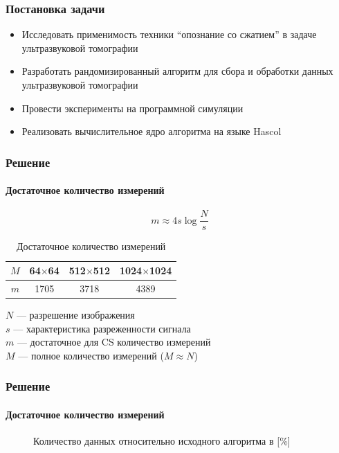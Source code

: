 \documentclass{beamer}
\begin{document}
\begin{frame}
\frametitle{Постановка задачи}
\begin{itemize}
\item Исследовать применимость техники ``опознание со сжатием'' в задаче ультразвуковой томографии
\item Разработать рандомизированный алгоритм для сбора и обработки данных ультразвуковой томографии
\item Провести эксперименты на программной симуляции
\item Реализовать вычислительное ядро алгоритма на языке Hascol
\end{itemize}

\end{frame}

\begin{frame}
\frametitle{Решение}
\framesubtitle{Достаточное количество измерений}
$$m \approx 4s\log{\frac{N}{s}}$$
\begin{table}[h]
	\centering
	\caption{Достаточное количество измерений}
	\begin{tabular}{| c | c | c | c |}
    	\hline
		$M$ & 64$\times$64 & 512$\times$512 & 1024$\times$1024 \\
    	\hline
    	$m$ & 1705 & 3718 & 4389 \\
    	\hline
	\end{tabular}
\end{table}

\small
$N$ --- разрешение изображения\\
$s$ --- характеристика разреженности сигнала\\
$m$ --- достаточное для CS количество измерений\\
$M$ --- полное количество измерений ($M\approx N$)
\normalsize

\end{frame}

\begin{frame}
\frametitle{Решение}
\framesubtitle{Достаточное количество измерений}

\begin{figure}[h]
	\centering
	\caption{Количество данных относительно исходного алгоритма в [\%]}
\end{figure}

\end{frame}
\end{document}
